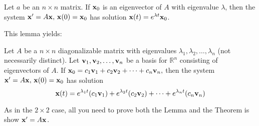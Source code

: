 \documentclass[10pt]{article}
\begin{document}
\begin{lemma}
    Let $a$ be an $n \times n$ matrix. If $\mathbf{x}_0$ is an eigenvector of $A$ with eigenvalue $\lambda$, then the system $\mathbf{x}'=A\mathbf{x},\, \mathbf{x}(0)=\mathbf{x}_0$ has solution $\mathbf{x}(t)=e^{\lambda t}\mathbf{x}_0$.
\end{lemma}
This lemma yields:
\begin{theorem}
    Let $A$ be a $n\times n$ diagonalizable matrix with eigenvalues $\lambda_1, \lambda_2, \dots, \lambda_n$ (not necessarily distinct). Let $\mathbf{v}_1, \mathbf{v}_2, \dots, \mathbf{v}_n$ be a basis for $\mathbb{R}^n$ consisting of eigenvectors of $A$. If $\mathbf{x}_0 = c_1\mathbf{v}_1 + c_2\mathbf{v}_2+\cdots +c_n\mathbf{v}_n,$ then the system $\mathbf{x}'=A\mathbf{x},\, \mathbf{x}(0)=\mathbf{x}_0$ has solution
    \begin{equation}
        \mathbf{x}(t) = e^{\lambda_1 t}(c_1\mathbf{v}_1) + e^{\lambda_2 t}(c_2\mathbf{v}_2) + \cdots + e^{\lambda_n t}(c_n\mathbf{v}_n)
    \end{equation}
    \vspace{2mm}
\end{theorem}
\begin{prooof}
    As in the $2\times 2$ case, all you need to prove both the Lemma and the Theorem is show $\mathbf{x}'=A\mathbf{x}$.
\end{prooof}
\newpage
\end{document}

